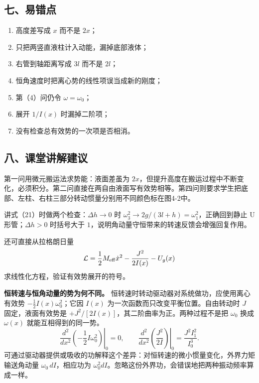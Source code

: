 \documentclass[12pt,a4paper,UTF8]{ctexart}
\newcommand{\tightlist}{\setlength{\itemsep}{0pt}\setlength{\parskip}{0pt}}
\begin{document}
\subsection{七、易错点}\label{ux4e03ux6613ux9519ux70b9-3}

\begin{enumerate}
\def\labelenumi{\arabic{enumi}.}
\tightlist
\item
  高度差写成 \(x\) 而不是 \(2x\)；
\item
  只把两竖直液柱计入动能，漏掉底部液体；
\item
  右管到轴距离写成 \(3l\) 而不是 \(2l\)；
\item
  恒角速度时把离心势的线性项误当成新的刚度；
\item
  第（4）问仍令 \(\omega=\omega_0\)；
\item
  展开 \(1/I(x)\) 时漏掉二阶项；
\item
  没有检查总有效势的一次项是否相消。
\end{enumerate}

\subsection{八、课堂讲解建议}\label{ux516bux8bfeux5802ux8bb2ux89e3ux5efaux8bae-3}

第一问用微元搬运法求势能：液面差虽为
\(2x\)，但提升高度在搬运过程中不断变化，必须积分。第二问直接在两自由液面写有效势相等。第四问则要求学生把底部、左柱、右柱三部分转动惯量分别用不同颜色标在图4-2中。

讲式（21）时做两个检查：\(\Delta h\to0\) 时
\(\omega_3^2\to2g/(3l+h)=\omega_1^2\)，正确回到静止 U
形管；\(\Delta h>0\) 时括号大于
\(1\)，说明角动量守恒带来的转速反馈会增强回复作用。

还可直接从拉格朗日量 \[
\mathcal L=\frac12M_{\rm eff}\dot x^2-\frac{J^2}{2I(x)}-U_g(x)
\] 求线性化方程，验证有效势展开的符号。

\textbf{恒转速与恒角动量的势为何不同。}
恒转速时转动驱动器对系统做功，应使用离心有效势
\(-\tfrac12I(x)\omega_0^2\)；它因 \(I(x)\)
为一次函数而只改变平衡位置。自由转动时 \(J\) 固定，液面有效势是
\(+J^2/[2I(x)]\)，其二阶曲率为正。两种过程不是把 \(\omega_0\) 换成
\(\omega(x)\) 就能互相得到的同一势。 \[
\left.\frac{d^2}{dx^2}\left(-\frac12I\omega_0^2\right)\right|_0=0,
\qquad
\left.\frac{d^2}{dx^2}\left(\frac{J^2}{2I}\right)\right|_0
=\frac{J^2I_1^2}{I_0^3}.
\]
可通过驱动器提供或吸收的功解释这个差异：对恒转速的微小惯量变化，外界力矩输送角动量
\(\omega_0\,dI\)，相应功为
\(\omega_0^2dI\)。忽略这份外界功，会错误地把两种振动频率算成一样。
\end{document}
